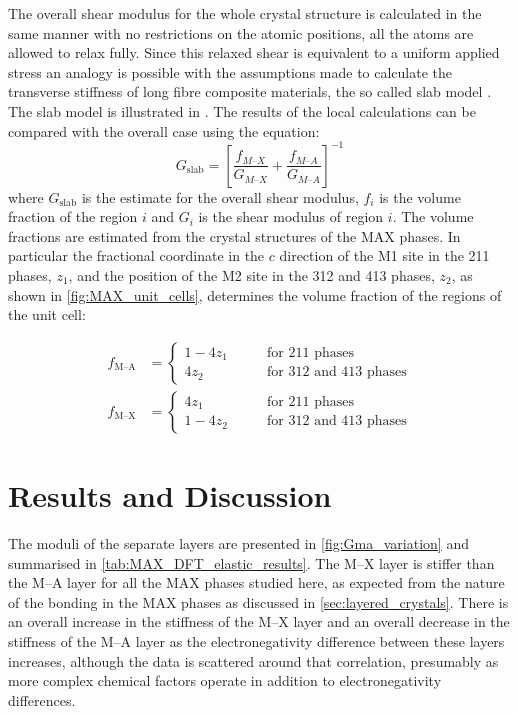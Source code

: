 

The overall shear modulus for the whole crystal structure is calculated in the same manner with no restrictions on the atomic positions, all the atoms are allowed to relax fully. Since this relaxed shear is equivalent to a uniform applied stress an analogy is possible with the assumptions made to calculate the transverse stiffness of long fibre composite materials, the so called slab model \cite{Hull1996ch4}. The slab model is illustrated in . The results of the local calculations can be compared with the overall case using the equation:
\begin{equation}
G_{\text{slab}} = \left[ \frac{f_{M\text{--}X}}{G_{M\text{--}X}} + \frac{f_{M\text{--}A}}{G_{M\text{--}A}} \right]^{-1} \label{eqn:slab_model}
\end{equation}
where $G_{\text{slab}}$ is the estimate for the overall shear modulus, $f_i$ is the volume fraction of the region $i$ and $G_i$ is the shear modulus of region $i$. The volume fractions are estimated from the crystal structures of the MAX phases. In particular the fractional coordinate in the $c$ direction of the M1 site in the 211 phases, $z_1$, and the position of the M2 site in the 312 and 413 phases, $z_2$, as shown in \autoref{fig:MAX_unit_cells}, determines the volume fraction of the regions of the unit cell:

\begin{subequations}
\begin{align}
f_{\text{M--A}} &= 
\begin{cases}
1-4z_1 & \qquad \text{for 211 phases} \\
4z_2 & \qquad \text{for 312 and 413 phases}
\end{cases}  \\[1ex]
f_{\text{M--X}} &= 
\begin{cases}
4z_1 & \qquad \text{for 211 phases} \\
1 - 4z_2 & \qquad \text{for 312 and 413 phases}
\end{cases}
\end{align}
\end{subequations}

\section{Results and Discussion}

The moduli of the separate layers are presented in \autoref{fig:Gma_variation} and summarised in \autoref{tab:MAX_DFT_elastic_results}. The M--X layer is stiffer than the M--A layer for all the MAX phases studied here, as expected from the nature of the bonding in the MAX phases as discussed in \autoref{sec:layered_crystals}. There is an overall increase in the stiffness of the M--X layer and an overall decrease in the stiffness of the M--A layer as the electronegativity difference between these layers increases, although the data is scattered around that correlation, presumably as more complex chemical factors operate in addition to electronegativity differences.


